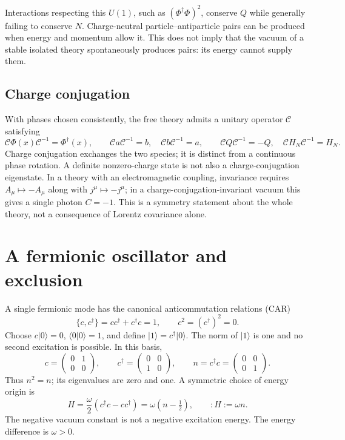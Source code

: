 \documentclass[11pt]{article}
\newcommand{\vac}{\lvert0\rangle}
\newcommand{\Dc}{\mathcal C}
\begin{document}
Interactions respecting this \(U(1)\), such as \((\Phi^\dagger\Phi)^2\),
conserve \(Q\) while generally failing to conserve \(N\). Charge-neutral
particle--antiparticle pairs can be produced when energy and momentum
allow it. This does not imply that the vacuum of a stable isolated theory
spontaneously produces pairs: its energy cannot supply them.

\subsection{Charge conjugation}
With phases chosen consistently, the free theory admits a unitary
operator \(\Dc\) satisfying
\begin{equation}
 \Dc\Phi(x)\Dc^{-1}=\Phi^\dagger(x),\qquad
 \Dc a\Dc^{-1}=b,\quad \Dc b\Dc^{-1}=a,\qquad
 \Dc Q\Dc^{-1}=-Q,\quad \Dc H_N\Dc^{-1}=H_N.
 \label{s-eq:C}
\end{equation}
Charge conjugation exchanges the two species; it is distinct from a
continuous phase rotation. A definite nonzero-charge state is not also a
charge-conjugation eigenstate. In a theory with an electromagnetic
coupling, invariance requires \(A_\mu\mapsto-A_\mu\) along with
\(j^\mu\mapsto-j^\mu\); in a charge-conjugation-invariant vacuum this gives
a single photon \(C=-1\). This is a symmetry statement about the whole
theory, not a consequence of Lorentz covariance alone.



\section{A fermionic oscillator and exclusion}
A single fermionic mode has the canonical anticommutation relations (CAR)
\begin{equation}
 \{c,c^\dagger\}=cc^\dagger+c^\dagger c=1,
 \qquad c^2=(c^\dagger)^2=0.
 \label{f-eq:oneCAR}
\end{equation}
Choose \(c\vac=0\), \(\langle0|0\rangle=1\), and define \(|1\rangle=c^\dagger\vac\).
The norm of \(|1\rangle\) is one and no second excitation is possible.
In this basis,
\[
 c=\begin{pmatrix}0&1\\0&0\end{pmatrix},\qquad
 c^\dagger=\begin{pmatrix}0&0\\1&0\end{pmatrix},\qquad
 n=c^\dagger c=\begin{pmatrix}0&0\\0&1\end{pmatrix}.
\]
Thus \(n^2=n\); its eigenvalues are zero and one. A symmetric choice of
energy origin is
\begin{equation}
 H=\frac\omega2(c^\dagger c-cc^\dagger)=\omega(n-\tfrac12),
 \qquad :H:=\omega n.
 \label{f-eq:fermionoscillator}
\end{equation}
The negative vacuum constant is not a negative excitation energy.
The energy difference is \(\omega>0\).
\end{document}
